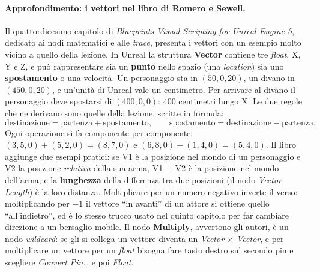 \paragraph{Approfondimento: i vettori nel libro di Romero e Sewell.} Il
quattordicesimo capitolo di \emph{Blueprints Visual Scripting for Unreal Engine 5},
dedicato ai nodi matematici e alle \emph{trace}, presenta i vettori con un esempio
molto vicino a quello della lezione. In Unreal la struttura \textbf{Vector} contiene
tre \emph{float}, X, Y e Z, e può rappresentare sia un \textbf{punto} nello spazio
(una \emph{location}) sia uno \textbf{spostamento} o una velocità. Un personaggio sta
in $(50, 0, 20)$, un divano in $(450, 0, 20)$, e un'unità di Unreal vale un
centimetro. Per arrivare al divano il personaggio deve spostarsi di $(400, 0, 0)$: 400
centimetri lungo X. Le due regole che ne derivano sono quelle della lezione, scritte
in formula:
\[
  \text{destinazione} = \text{partenza} + \text{spostamento},
  \qquad
  \text{spostamento} = \text{destinazione} - \text{partenza}.
\]
Ogni operazione si fa componente per componente: $(3,5,0) + (5,2,0) = (8,7,0)$ e
$(6,8,0) - (1,4,0) = (5,4,0)$. Il libro aggiunge due esempi pratici: se V1 è la
posizione nel mondo di un personaggio e V2 la posizione \emph{relativa} della sua arma,
V1 $+$ V2 è la posizione nel mondo dell'arma; e la \textbf{lunghezza} della differenza
tra due posizioni (il nodo \emph{Vector Length}) è la loro distanza. Moltiplicare per un
numero negativo inverte il verso: moltiplicando per $-1$ il vettore ``in avanti'' di un
attore si ottiene quello ``all'indietro'', ed è lo stesso trucco usato nel quinto
capitolo per far cambiare direzione a un bersaglio mobile. Il nodo \textbf{Multiply},
avvertono gli autori, è un nodo \emph{wildcard}: se gli si collega un vettore diventa
un \emph{Vector $\times$ Vector}, e per moltiplicare un vettore per un \emph{float}
bisogna fare tasto destro sul secondo pin e scegliere \emph{Convert Pin\ldots} e poi
\emph{Float}.

